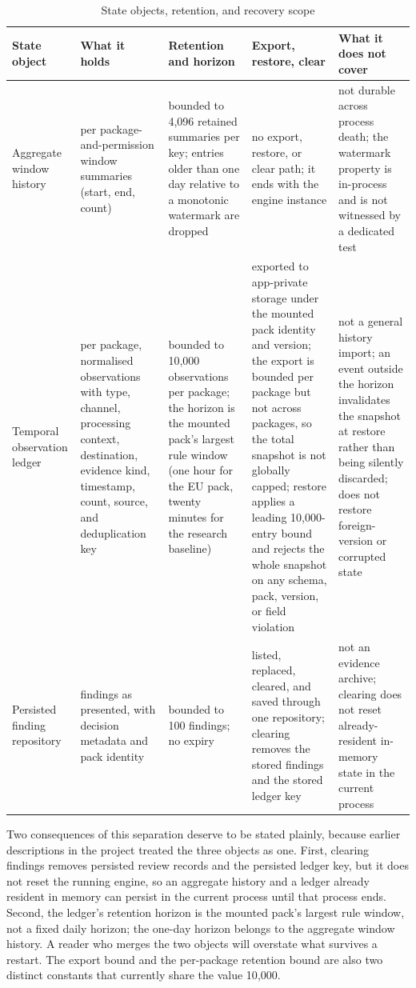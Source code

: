 \begin{table}[H]
\centering
\caption{State objects, retention, and recovery scope}
\label{tab:state-objects}
\scriptsize
\setlength{\tabcolsep}{3pt}
\begin{tabular}{>{\raggedright\arraybackslash}p{}>{\raggedright\arraybackslash}p{}>{\raggedright\arraybackslash}p{}>{\raggedright\arraybackslash}p{}>{\raggedright\arraybackslash}p{}}
\toprule
State object & What it holds & Retention and horizon & Export, restore, clear & What it does not cover \\
\midrule
Aggregate window history & per package-and-permission window summaries (start, end, count) & bounded to 4{,}096 retained summaries per key; entries older than one day relative to a monotonic watermark are dropped & no export, restore, or clear path; it ends with the engine instance & not durable across process death; the watermark property is in-process and is not witnessed by a dedicated test \\
Temporal observation ledger & per package, normalised observations with type, channel, processing context, destination, evidence kind, timestamp, count, source, and deduplication key & bounded to 10{,}000 observations per package; the horizon is the mounted pack's largest rule window (one hour for the EU pack, twenty minutes for the research baseline) & exported to app-private storage under the mounted pack identity and version; the export is bounded per package but not across packages, so the total snapshot is not globally capped; restore applies a leading 10{,}000-entry bound and rejects the whole snapshot on any schema, pack, version, or field violation & not a general history import; an event outside the horizon invalidates the snapshot at restore rather than being silently discarded; does not restore foreign-version or corrupted state \\
Persisted finding repository & findings as presented, with decision metadata and pack identity & bounded to 100 findings; no expiry & listed, replaced, cleared, and saved through one repository; clearing removes the stored findings and the stored ledger key & not an evidence archive; clearing does not reset already-resident in-memory state in the current process \\
\bottomrule
\end{tabular}
\end{table}

Two consequences of this separation deserve to be stated plainly, because earlier descriptions in the project treated the three objects as one. First, clearing findings removes persisted review records and the persisted ledger key, but it does not reset the running engine, so an aggregate history and a ledger already resident in memory can persist in the current process until that process ends. Second, the ledger's retention horizon is the mounted pack's largest rule window, not a fixed daily horizon; the one-day horizon belongs to the aggregate window history. A reader who merges the two objects will overstate what survives a restart. The export bound and the per-package retention bound are also two distinct constants that currently share the value 10{,}000.

